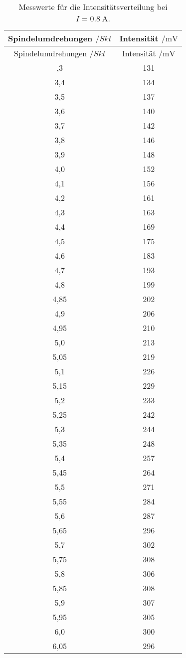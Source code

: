 \begin{longtable}{cc}
  \caption{Messwerte für die Intensitätsverteilung bei $I=\SI{0.8}{\ampere}$.}\\
  \hline
  \toprule
  Spindelumdrehungen $/Skt$ & Intensität $/\si{\milli\volt}$ \\
  \midrule
\endfirsthead
\toprule
Spindelumdrehungen $/Skt$ & Intensität $/\si{\milli\volt}$ \\
\midrule
\endhead
\bottomrule
\endfoot
\bottomrule
\bottomrule
\endlastfoot
3,3 &131\\
3,4 &134\\
3,5 &137\\
3,6 &140\\
3,7 &142\\
3,8 &146\\
3,9 &148\\
4,0 & 152\\
4,1 & 156\\
4,2 & 161\\
4,3 & 163\\
4,4 & 169\\
4,5 & 175\\
4,6  &183\\
4,7  &193\\
4,8  &199\\
4,85 &202\\
4,9  &206\\
4,95 &210\\
5,0  &213\\
5,05 &219\\
5,1  &226\\
5,15 &229\\
5,2  &233\\
5,25 &242\\
5,3  &244\\
5,35 &248\\
5,4  &257\\
5,45 &264\\
5,5  &271\\
5,55 &284\\
5,6  &287\\
5,65 &296\\
5,7  &302\\
5,75 &308\\
5,8  &306\\
5,85 &308\\
5,9  &307\\
5,95 &305\\
6,0  &300\\
6,05 &296\\

\end{longtable}
